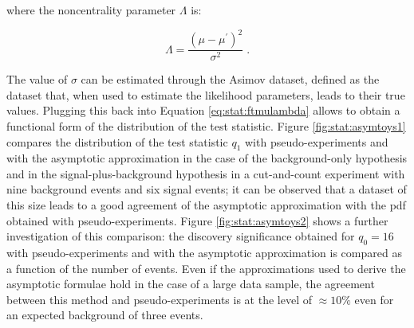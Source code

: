 \noindent where the noncentrality parameter $\Lambda$ is:

\begin{equation}
\label{eq:stat:noncentrality}
\Lambda = \frac{(\mu - \mu^{\prime})^2}{\sigma^2} \; .
\end{equation}

\noindent The value of $\sigma$ can be estimated through the Asimov dataset, defined as the dataset that, when used to estimate the likelihood parameters, leads to their true values. Plugging this back into Equation \ref{eq:stat:ftmulambda} allows to obtain a functional form of the distribution of the test statistic. Figure \ref{fig:stat:asymtoys1} compares the distribution of the test statistic $q_1$ with pseudo-experiments and with the asymptotic approximation in the case of the background-only hypothesis and in the signal-plus-background hypothesis
in a cut-and-count experiment with nine background events and six signal events; 
it can be observed that a dataset of this size leads to a good agreement of the asymptotic approximation with the \gls{pdf} obtained with pseudo-experiments.
Figure \ref{fig:stat:asymtoys2} shows a further investigation of this comparison: the discovery significance obtained for $q_0=16$ with pseudo-experiments and with the asymptotic approximation is compared as a function of the number of events. 
Even if the approximations used to derive the asymptotic formulae hold in the case of a large data sample, 
the agreement between this method and pseudo-experiments is at the level of $\approx 10\%$ even for an expected background of three events. 


